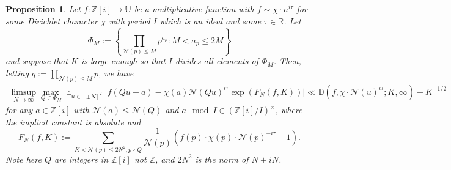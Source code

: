 \documentclass[11pt]{amsart}
\newtheorem{proposition}[lemma]{Proposition}
\theoremstyle{definition}
\DeclareMathOperator*{\E}{\mathbb{E}}
\newcommand{\D}{{\mathbb D}}
\newcommand{\NN}{{\mathcal N}}
\newcommand{\R}{{\mathbb R}}
\newcommand{\Z}{{\mathbb Z}}
\newcommand{\U}{{\mathbb U}}
\begin{document}
\begin{proposition}\label{p25}
    Let $f\colon \Z[i]\to\U$ be a multiplicative function with $f\sim \chi\cdot n^{i\tau}$ for some Dirichlet character $\chi$ with period $I$ {\color{red} which is an ideal} and some $\tau\in\R$. Let 
    $$\Phi_M:=\left\{\prod_{\NN(p)\leq M}p^{a_{p}}\colon M<a_{p}\leq 2M\right\}$$
    and suppose that $K$ is large enough so that $I$ divides all elements of $\Phi_{M}$. Then, letting $q:=\prod_{\NN(p)\leq M} p$, we have 
\begin{equation}
    \begin{split}
        \limsup_{N\to\infty}\max_{Q\in \Phi_{M}}\E_{u\in[\pm N]^{2}}\vert f(Qu+a)-\chi(a)\NN(Qu)^{i\tau}\exp(F_{N}(f,K))\vert\ll \D(f,\chi\cdot \NN(u)^{i\tau};K,\infty)+K^{-1/2}
    \end{split}
\end{equation}
for any $a\in\Z[i]$ with $\NN(a)\leq \NN(Q)$ and $a \mod I\in (\Z[i]/I)^{\times}$,
where  the implicit constant is absolute and
$$F_{N}(f,K):=\sum_{K<\NN(p)\leq 2N^{2}, p \nmid Q}\frac{1}{\NN(p)}(f(p)\cdot\overline{\chi}(p)\cdot \NN(p)^{-i\tau}-1).$$
 {\color{red} Note here $Q$ are integers in $\Z[i]$ not $\Z$, and $2N^{2}$ is the norm of $N+iN$.}
 \end{proposition}
\end{document}
